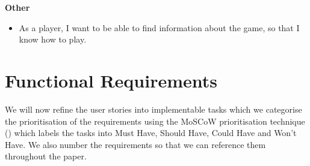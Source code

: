 \documentclass{l4proj}
\begin{document}
\textbf{Other}
\begin{itemize}
    \item As a player, I want to be able to find information about the game, so that I know how to play.
\end{itemize}

\section{Functional Requirements}
We will now refine the user stories into implementable tasks which we categorise the prioritisation of the requirements using the MoSCoW prioritisation technique (\cite{moscow}) which labels the tasks into Must Have, Should Have, Could Have and Won't Have. We also number the requirements so that we can reference them throughout the paper.
\end{document}
